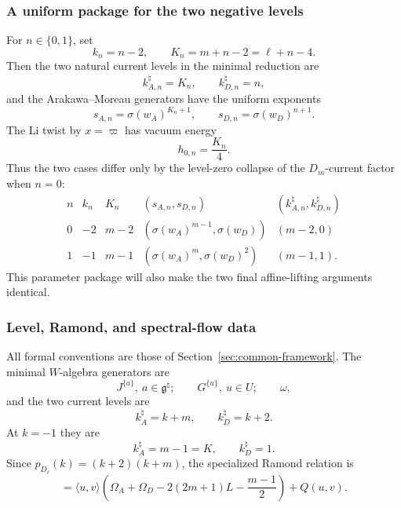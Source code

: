 \documentclass[11pt,reqno]{amsart}
\theoremstyle{definition}
\theoremstyle{remark}
\begin{document}
\subsubsection{A uniform package for the two negative levels}


For \(n\in\{0,1\}\), set
\begin{equation}
 k_n=n-2,
 \qquad
 K_n=m+n-2=\ell+n-4.
 \label{dl:eq:Dl-uniform-level-parameters}
\end{equation}
Then the two natural current levels in the minimal reduction are
\begin{equation*}
 k_{A,n}^{\natural}=K_n,
 \qquad
 k_{D,n}^{\natural}=n,
\end{equation*}
and the Arakawa--Moreau generators have the uniform exponents
\begin{equation}
 s_{A,n}=\sigma(w_A)^{K_n+1},
 \qquad
 s_{D,n}=\sigma(w_D)^{n+1}.
 \label{dl:eq:Dl-uniform-singular-generators}
\end{equation}
The Li twist by \(x=\varpi\) has vacuum energy
\begin{equation*}
 h_{0,n}=\frac{K_n}{4}.
\end{equation*}
Thus the two cases differ only by the level-zero collapse of the
\(D_m\)-current factor when \(n=0\):
\begin{equation*}
\begin{array}{c|c|c|c|c}
 n&k_n&K_n&(s_{A,n},s_{D,n})&(k_{A,n}^{\natural},k_{D,n}^{\natural})\\ \hline
 0&-2&m-2&(\sigma(w_A)^{m-1},\sigma(w_D))&(m-2,0)\\
 1&-1&m-1&(\sigma(w_A)^m,\sigma(w_D)^2)&(m-1,1).
\end{array}
\end{equation*}
This parameter package will also make the two final affine-lifting
arguments identical.

\subsubsection{Level, Ramond, and spectral-flow data}


All formal conventions are those of Section~\ref{sec:common-framework}.  The
minimal $W$-algebra generators are
\begin{equation}
  J^{\{a\}},\ a\in\mathfrak g^\natural;
  \qquad G^{\{u\}},\ u\in U;
  \qquad \omega,
  \label{dl:eq:Dl-minimal-W-generators}
\end{equation}
and the two current levels are
\begin{equation*}
  k_A^\natural=k+m,\qquad k_D^\natural=k+2.
\end{equation*}
At $k=-1$ they are
\begin{equation}
  k_A^\natural=m-1=K,\qquad k_D^\natural=1.
  \label{dl:eq:Dl-level-minus-one-natural-levels}
\end{equation}
Since $p_{D_\ell}(k)=(k+2)(k+m)$, the specialized Ramond relation is
\begin{equation}
 [u,v]=\langle u,v\rangle
 \left(\Omega_A+\Omega_D-2(2m+1)L-\frac{m-1}{2}\right)+Q(u,v).
 \label{dl:eq:Dl-level-minus-one-Ramond-Zhu-relation}
\end{equation}
\end{document}
